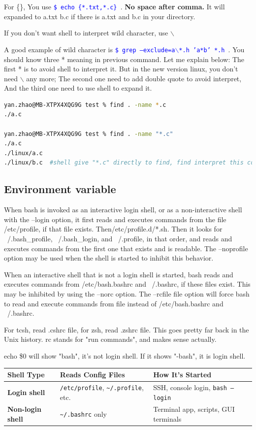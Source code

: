 \documentclass[paper=8.5in:11in, twoside, 12pt, pagesize=pdftex]{book}
\newcommand{\linuxcommand}[1]{\texttt{\textcolor{blue}{\$ #1 \Pisymbol{psy}{191}}}}
\begin{document}
	For \{\}, You use \linuxcommand{echo \{*.txt,*.c\}}. \textbf{No space after comma.} It will expanded to a.txt b.c if there is a.txt and b.c in your directory.

	If you don't want shell to interpret wild character, use $\backslash$

	A good example of wild character is \linuxcommand{grep --exclude=a$\backslash$*.h 'a*b' *.h}. You should know three * meaning in previous command. Let me explain below: The first * is to avoid shell to interpret it. But in the new version linux, you don't need $\backslash$ any more; The second one need to add double quote to avoid interpret, And the third one need to use shell to expand it.  
\begin{lstlisting}[language=bash]
yan.zhao@MB-XTPX4XQG9G test % find . -name *.c
./a.c

yan.zhao@MB-XTPX4XQG9G test % find . -name "*.c"
./a.c
./linux/a.c
./linux/b.c  #shell give "*.c" directly to find, find interpret this command inside it.	
\end{lstlisting}		
		
\subsection{Environment variable}

	When bash is invoked as an interactive login shell, or as a non-interactive shell with the --login option, it first reads and executes commands from the file /etc/profile, if that file exists. Then/etc/profile.d/*.sh. Then it looks for ~/.bash\_profile,  ~/.bash\_login, and ~/.profile, in that order, and reads and executes commands from the first one that exists and is readable. The --noprofile option may be used when the shell is started to inhibit this behavior.
		
	When an interactive shell that is not a login shell is started, bash reads and executes commands from  /etc/bash.bashrc and ~/.bashrc, if these files exist. This may be inhibited by using the --norc option. The --rcfile file option will force bash to read and execute commands from file instead of /etc/bash.bashrc and  ~/.bashrc.	

	For tcsh, read .cshrc file, for zsh, read .zshrc file. This goes pretty far back in the Unix history. rc stands for "run commands", and makes sense actually.

	echo \$0 will show "bash", it's not login shell. If it shows "-bash", it is login shell.  
	
	\begin{tabular}{|l|l|l|}
		\hline
		\textbf{Shell Type}       & \textbf{Reads Config Files}                         & \textbf{How It's Started}                    \\ \hline
		\textbf{Login shell}      & \texttt{/etc/profile}, \texttt{\~{}/.profile}, etc. & SSH, console login, \texttt{bash --login}   \\ \hline
		\textbf{Non-login shell}  & \texttt{\~{}/.bashrc} only                          & Terminal app, scripts, GUI terminals        \\ \hline
	\end{tabular}
	
\end{document}

